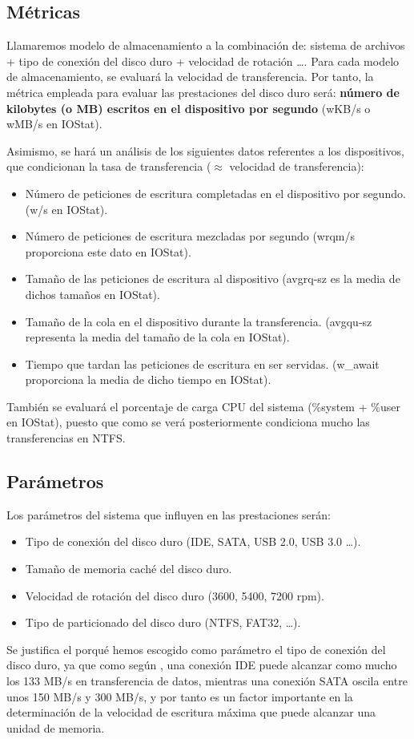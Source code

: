 \documentclass[a4paper,10pt]{article}
\renewcommand{\texttt}[2][black!60]{\textcolor{#1}{\ttfamily #2}}
\begin{document}
\subsection{Métricas}
Llamaremos modelo de almacenamiento a la combinación de: sistema de archivos + tipo de conexión del disco duro + velocidad de rotación \ldots.
Para cada modelo de almacenamiento, se evaluará la velocidad de transferencia. Por tanto, la métrica empleada para evaluar las prestaciones 
del disco duro será: \textbf{número de kilobytes (o MB) escritos en el dispositivo por segundo} (\texttt{wKB/s} o \texttt{wMB/s} en IOStat).
 
 Asimismo, se hará un análisis de los siguientes datos referentes a los dispositivos, que condicionan la tasa de transferencia
 ($\approx$ velocidad de transferencia):
\begin{itemize}
 \item Número de peticiones de escritura completadas en el dispositivo por segundo. (\texttt{w/s} en IOStat).
 \item Número de peticiones de escritura mezcladas por segundo (\texttt{wrqm/s} proporciona este dato en IOStat).
 \item Tamaño de las peticiones de escritura al dispositivo (\texttt{avgrq-sz} es la media de dichos tamaños en
 IOStat).
 \item Tamaño de la cola en el dispositivo durante la transferencia. (\texttt{avgqu-sz} representa la media del
 tamaño de la cola en IOStat).
 \item Tiempo que tardan las peticiones de escritura en ser servidas. (\texttt{w\_await} proporciona la media
 de dicho tiempo en IOStat).
\end{itemize}

 También se evaluará el porcentaje de carga CPU del sistema (\texttt{\%system} + \texttt{\%user} en IOStat), 
 puesto que como se verá posteriormente condiciona mucho las transferencias en NTFS.

\subsection{Parámetros}
Los parámetros del sistema que influyen en las prestaciones serán: \cite{hddparam}
\begin{itemize}
 \item Tipo de conexión del disco duro (IDE, SATA, USB 2.0, USB 3.0 \ldots).
 \item Tamaño de memoria caché del disco duro.
 \item Velocidad de rotación del disco duro (3600, 5400, 7200 rpm).
 \item Tipo de particionado del disco duro (NTFS, FAT32, \ldots).
\end{itemize}
Se justifica el porqué hemos escogido como parámetro el tipo de conexión del disco duro, ya que como
según \cite{ide}, una conexión IDE puede alcanzar como mucho los 133 MB/s en transferencia de datos,
mientras una conexión SATA oscila entre unos 150 MB/s y 300 MB/s, y por tanto es un factor importante en la determinación
de la velocidad de escritura máxima que puede alcanzar una unidad de memoria.
\end{document}
